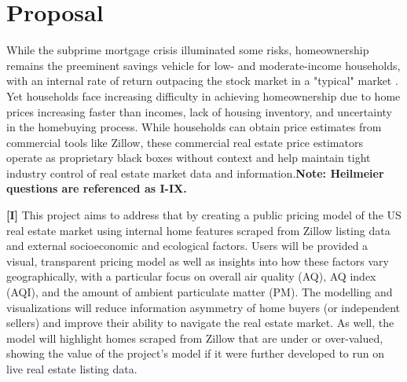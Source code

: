 \documentclass[sigconf,nonacm,11pt]{acmart}
\begin{document}


\section{Proposal}
While the subprime mortgage crisis illuminated some risks, homeownership remains the preeminent savings vehicle for low- and moderate-income households, with an internal rate of return outpacing the stock market in a "typical" market \cite{Goodman2018}. Yet households face increasing difficulty in achieving homeownership due to home prices increasing faster than incomes, lack of housing inventory, and uncertainty in the homebuying process. While households can obtain price estimates from commercial tools like Zillow, these commercial real estate price estimators operate as proprietary black boxes without context and help maintain tight industry control of real estate market data and information.\newline\textbf{Note: Heilmeier questions are referenced as I-IX.}


\textbf{[I]} This project aims to address that by creating a public pricing model of the US real estate market using internal home features scraped from Zillow listing data and external socioeconomic and ecological factors. Users will be provided a visual, transparent pricing model as well as insights into how these factors vary geographically, with a particular focus on overall air quality (AQ), AQ index (AQI), and the amount of ambient particulate matter (PM). The modelling and visualizations will reduce information asymmetry of home buyers (or independent sellers) and improve their ability to navigate the real estate market. As well, the model will highlight homes scraped from Zillow that are under or over-valued, showing the value of the project's model if it were further developed to run on live real estate listing data.
\end{document}
